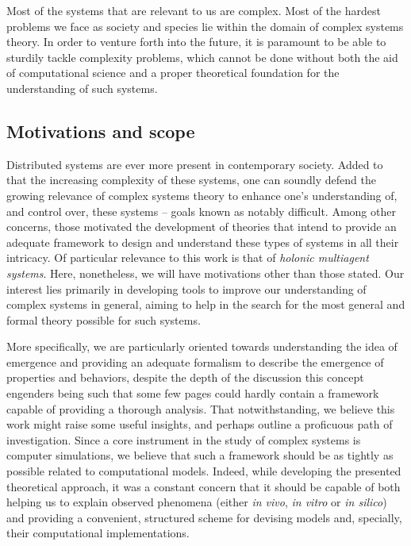 Most of the systems that are relevant to us are complex. Most of the hardest problems we face as society and species lie within the domain of complex systems theory. In order to venture forth into the future, it is paramount to be able to sturdily tackle complexity problems, which cannot be done without both the aid of computational science and a proper theoretical foundation for the understanding of such systems.

\subsection{Motivations and scope}

Distributed systems are ever more present in contemporary society. Added to that the increasing complexity of these systems, one can soundly defend the growing relevance of complex systems theory to enhance one's understanding of, and control over, these systems -- goals known as notably difficult. Among other concerns, those motivated the development of theories that intend to provide an adequate framework to design and understand these types of systems in all their intricacy. Of particular relevance to this work is that of \textit{holonic multiagent systems}. Here, nonetheless, we will have motivations other than those stated. Our interest lies primarily in developing tools to improve our understanding of complex systems in general, aiming to help in the search for the most general and formal theory possible for such systems. 

More specifically, we are particularly oriented towards understanding the idea of emergence and providing an adequate formalism to describe the emergence of properties and behaviors, despite the depth of the discussion this concept engenders being such that some few pages could hardly contain a framework capable of providing a thorough analysis. That notwithstanding, we believe this work might raise some useful insights, and perhaps outline a proficuous path of investigation. Since a core instrument in the study of complex systems is computer simulations, we believe that such a framework should be as tightly as possible related to computational models. Indeed, while developing the presented theoretical approach, it was a constant concern that it should be capable of both helping us to explain observed phenomena (either \textit{in vivo}, \textit{in vitro} or \textit{in silico}) and providing a convenient, structured scheme for devising models and, specially, their computational implementations. 


